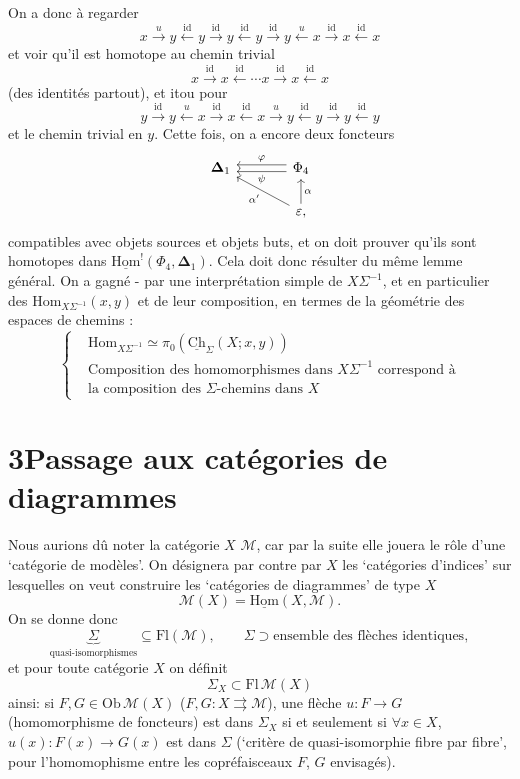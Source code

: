\documentclass[11pt]{article}
\newcommand{\printedpage}[1]{\marginpar{\footnotesize p.~#1}}
\newcommand{\msp}[1]{\marginpar{\footnotesize [#1]}}
\newcommand{\uCh}{\underline{\mathrm{Ch}}}
\newcommand{\uHom}{\underline{\mathrm{Hom}}}
\newcommand{\bDelta}{\boldsymbol{\Delta}}
\newcommand{\Hom}{\mathrm{Hom}}
\begin{document}
On a donc à regarder
\[
x \xrightarrow{u} y \xleftarrow{\mathrm{id}} y \xrightarrow{\mathrm{id}} y \xleftarrow{\mathrm{id}} y \xrightarrow{\mathrm{id}} y \xleftarrow{u} x \xrightarrow{\mathrm{id}} x \xleftarrow{\mathrm{id}} x
\]
et voir qu'il est homotope au chemin trivial
\[
x \xrightarrow{\mathrm{id}} x \xleftarrow{\mathrm{id}} \cdots x \xrightarrow{\mathrm{id}} x \xleftarrow{\mathrm{id}} x
\]
(des identités partout), et itou pour
\[
y \xrightarrow{\mathrm{id}} y \xleftarrow{u} x \xrightarrow{\mathrm{id}} x \xleftarrow{\mathrm{id}} x \xrightarrow{u} y \xleftarrow{\mathrm{id}} y \xrightarrow{\mathrm{id}} y \xleftarrow{\mathrm{id}} y
\]
et le chemin trivial en $y$. Cette fois, on a encore deux foncteurs
\[
\begin{tikzcd}[column sep=large]
\bDelta_1 & \Phi_4 \arrow[l, shift right, "\varphi"'] \arrow[l, shift left, "\psi"] \\
& \varepsilon, \arrow[ul, "\alpha'"] \arrow[u, "\alpha"']
\end{tikzcd}
\]
compatibles avec objets sources et objets buts, et on doit prouver qu'ils sont homotopes dans $\uHom^!(\Phi_4, \bDelta_1)$. Cela doit donc résulter du même lemme général. On a gagné - par une interprétation simple de $X\Sigma^{-1}$, et en particulier des $\Hom_{X\Sigma^{-1}}(x,y)$ et de leur composition, en termes de la géométrie des espaces de chemins :
\[
\left\{
\begin{aligned}
&\Hom_{X\Sigma^{-1}} \simeq \pi_0(\uCh_\Sigma(X;x,y)) \\ %
&\text{Composition des homomorphismes dans } X\Sigma^{-1} \text{ correspond à} \\
&\text{la composition des } \Sigma\text{-chemins dans } X
\end{aligned}
\right.
\]

\printedpage{18}
\noindent\msp{page 28}

\section*{3\quad Passage aux catégories de diagrammes}

Nous aurions dû noter la catégorie $X$ $\mathcal{M}$, car par la suite elle jouera le rôle d'une `catégorie de modèles'. On désignera par contre par $X$ les `catégories d'indices' sur lesquelles on veut construire les `catégories de diagrammes' de type $X$
\[
\mathcal{M}(X) = \uHom(X,\mathcal{M}).
\]
On se donne donc
\[
\underbrace{\Sigma}_{\text{quasi-isomorphismes}} \subseteq \mathrm{Fl}(\mathcal{M}), \qquad \Sigma \supset \text{ensemble des flèches identiques},
\]
et pour toute catégorie $X$ on définit
\[
\Sigma_X \subset \mathrm{Fl}\,\mathcal{M}(X)
\]
ainsi: si $F, G \in \mathrm{Ob}\,\mathcal{M}(X)$ ($F, G : X \rightrightarrows \mathcal{M}$), une flèche $u : F \longrightarrow G$ (homomorphisme de foncteurs) est dans $\Sigma_X$ si et seulement si $\forall x \in X$, $u(x) : F(x) \longrightarrow G(x)$ est dans $\Sigma$ (`critère de quasi-isomorphie fibre par fibre', pour l'homomophisme entre les copréfaisceaux $F$, $G$ envisagés). %
\end{document}
